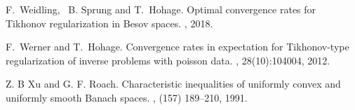 \documentclass[10pt]{iopart}
\begin{document}
\begin{thebibliography}{10}
F.~Weidling, ~B. Sprung and T.~Hohage.
\newblock Optimal convergence rates for Tikhonov regularization in Besov spaces.
, 2018.


F.~Werner and T.~Hohage.
\newblock Convergence rates in expectation for Tikhonov-type regularization of
  inverse problems with poisson data.
, 28(10):104004, 2012.

Z. B Xu and G. F. Roach.
\newblock Characteristic inequalities of uniformly convex and uniformly smooth Banach spaces.
, (157) 189--210, 1991.

\end{thebibliography}
\end{document}
